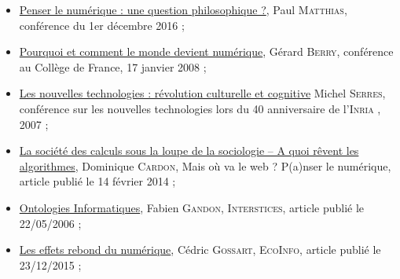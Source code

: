 \begin{gofurther}[before skip=12pt]
\begin{itemize}\jazzitem
\item \href{https://eduscol.education.fr/philosophie/actualites/archives/archives-actualites-2016/penser-le-numerique-une-question-philosophique}{Penser le numérique : une question philosophique ?}, Paul \textsc{Matthias}, conférence  du 1er décembre 2016 ;
\item \href{https://www.college-de-france.fr/site/gerard-berry/inaugural-lecture-2008-01-17-18h00.htm}{Pourquoi et comment le monde devient numérique}, Gérard \textsc{Berry}, conférence au Collège de France, 17 janvier 2008 ;
\item \href{https://www.youtube.com/watch?v=ZCBB0QEmT5g}{Les nouvelles technologies : révolution culturelle et cognitive} Michel \textsc{Serres}, conférence sur les nouvelles technologies lors du 40 anniversaire de l'\textsc{Inria} , 2007 ;
\item \href{http://maisouvaleweb.fr/la-societe-des-calculs-sous-la-loupe-de-la-sociologie-a-quoi-revent-les-algorithmes-dominique-cardon-lecture/}{La société des calculs sous la loupe de la sociologie – A quoi rêvent les algorithmes}, Dominique \textsc{Cardon},  Mais où va le web ?  P(a)nser le numérique, article publié le 14 février 2014 ;
\item \href{https://interstices.info/ontologies-informatiques/}{Ontologies Informatiques}, Fabien \textsc{Gandon}, \textsc{Interstices}, article publié le 22/05/2006 ;
\end{itemize}
\vspace*{2pt}
\begin{itemize}\jazzitem
\item \href{https://ecoinfo.cnrs.fr/2015/12/23/les-effets-rebond-du-numerique/}{Les effets rebond du numérique}, Cédric \textsc{Gossart}, \textsc{EcoInfo}, article publié le 23/12/2015 ;

\end{itemize}
\end{gofurther}
